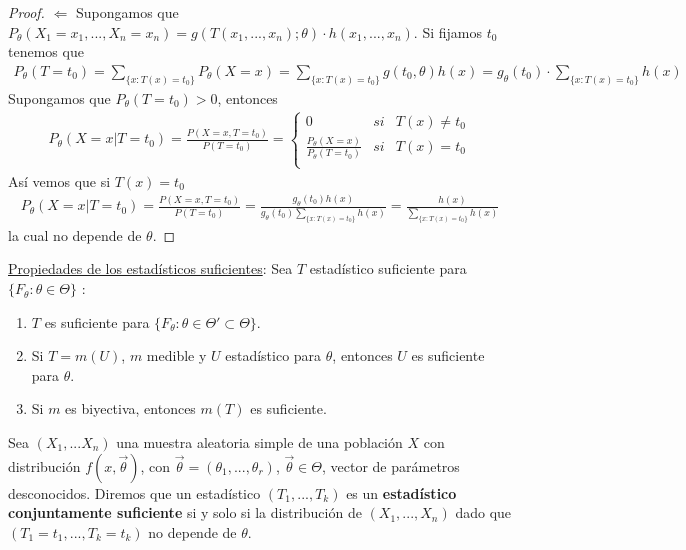 \begin{proof}
    $\boxed{\Longleftarrow}$ Supongamos que $P_{\theta}(X_1 = x_1,...,X_n = x_n) = g(T(x_1,...,x_n);\theta) \cdot h(x_1,...,x_n)$. Si fijamos $t_0$ tenemos que
    \begin{align*}
        P_{\theta}(T = t_0) = \sum_{\{x : T(x) = t_0\}}{P_{\theta}(X = x)} = \sum_{\{x : T(x) = t_0\}}{g(t_0,\theta)h(x)} = g_{\theta}(t_0) \cdot \sum_{\{x : T(x) = t_0\}}{h(x)}
    \end{align*}
    Supongamos que $P_{\theta}(T = t_0) > 0$, entonces
    \begin{align*}
        P_{\theta}(X = x | T = t_0) = \frac{P(X = x, T = t_0)}{P(T = t_0)} = \left\{ \begin{array}{lcc}
                                                                                         0                                             & si & T(x) \not = t_0 \\
                                                                                         \frac{P_{\theta}(X = x)}{P_{\theta}(T = t_0)} & si & T(x) = t_0      \\
                                                                                     \end{array}
        \right.
    \end{align*}
    Así vemos que si $T(x) = t_0$
    \begin{align*}
        P_{\theta}(X = x | T = t_0) = \frac{P(X = x, T = t_0)}{P(T = t_0)} = \frac{g_{\theta}(t_0)h(x)}{g_{\theta}(t_0)\sum_{\{x : T(x) = t_0\}}{h(x)}} = \frac{h(x)}{\sum_{\{x : T(x) = t_0\}}{h(x)}}
    \end{align*}
    la cual no depende de $\theta$.
\end{proof}

\underline{Propiedades de los estadísticos suficientes}:
Sea $T$ estadístico suficiente para $\{F_{\theta} : \theta \in \Theta\}$ :
\begin{enumerate}
    \item $T$ es suficiente para $\{F_{\theta} : \theta \in \Theta' \subset \Theta\}$.
    \item Si $T = m(U)$, $m$ medible y $U$ estadístico para $\theta$, entonces $U$ es suficiente para $\theta$.
    \item Si $m$ es biyectiva, entonces $m(T)$ es suficiente.
\end{enumerate}

\begin{defi}
    Sea $(X_1,...X_n)$ una muestra aleatoria simple de una población $X$ con distribución $f(x,\overrightarrow{\theta})$, con $\overrightarrow{\theta} = (\theta_1,...,\theta_r)$, $\overrightarrow{\theta} \in \Theta$, vector de parámetros desconocidos. Diremos que un estadístico $(T_1,...,T_k)$ es un \textbf{estadístico conjuntamente suficiente} si y solo si la distribución de $(X_1,...,X_n)$ dado que $(T_1 = t_1, ..., T_k = t_k)$ no depende de $\theta$.
\end{defi}

